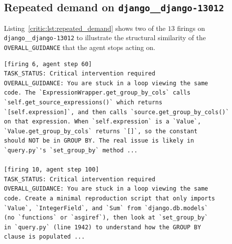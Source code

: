 \subsection{Repeated demand on \texttt{django\_\_django-13012}}
\label{critic:app:repeated_demand}

Listing~\ref{critic:lst:repeated_demand} shows two of the $13$ firings on \texttt{django\_\_django-13012} to illustrate the structural similarity of the \texttt{OVERALL\_GUIDANCE} that the agent stops acting on.

\begin{lstlisting}[caption={Trained critic firings $6$ (msg 127) and $10$ (msg 211) on \texttt{django\_\_django-13012}; both prescribe the same fix path.}, label={critic:lst:repeated_demand}]
[firing 6, agent step 60]
TASK_STATUS: Critical intervention required
OVERALL_GUIDANCE: You are stuck in a loop viewing the same
code. The `ExpressionWrapper.get_group_by_cols` calls
`self.get_source_expressions()` which returns
`[self.expression]`, and then calls `source.get_group_by_cols()`
on that expression. When `self.expression` is a `Value`,
`Value.get_group_by_cols` returns `[]`, so the constant
should NOT be in GROUP BY. The real issue is likely in
`query.py`'s `set_group_by` method ...

[firing 10, agent step 100]
TASK_STATUS: Critical intervention required
OVERALL_GUIDANCE: You are stuck in a loop viewing the same
code. Create a minimal reproduction script that only imports
`Value`, `IntegerField`, and `Sum` from `django.db.models`
(no `functions` or `asgiref`), then look at `set_group_by`
in `query.py` (line 1942) to understand how the GROUP BY
clause is populated ...
\end{lstlisting}

\clearpage
\endgroup
